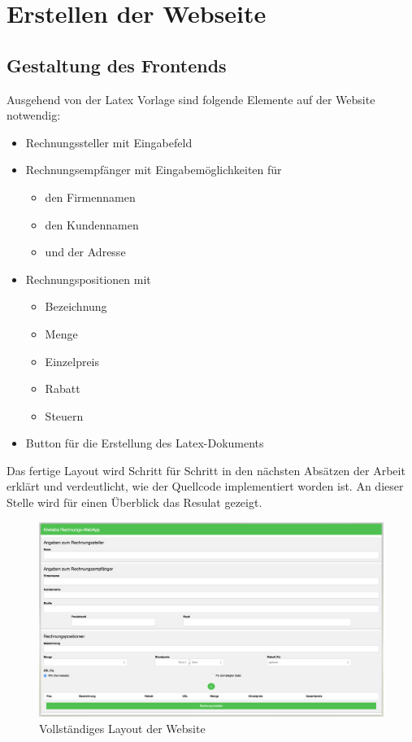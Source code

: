 \section{Erstellen der Webseite}
\label{sec:Erstellen_Webseite}
\subsection{Gestaltung des Frontends}
\label{subsec:Gestaltung_Webseite}
Ausgehend von der Latex Vorlage sind folgende Elemente auf der Website notwendig: 
%
\begin{itemize}
	\item  Rechnungssteller mit Eingabefeld
    \item  Rechnungsempfänger mit Eingabemöglichkeiten für  	
    		\begin{itemize}
				\item den Firmennamen
            	\item den Kundennamen
            	\item und der Adresse
         	\end{itemize}   
     \item Rechnungspositionen mit 
    	 	\begin{itemize}
				\item Bezeichnung
            	\item Menge
            	\item Einzelpreis
           	    \item Rabatt
           		\item Steuern
            \end{itemize}  
     
	\item Button für die Erstellung des Latex-Dokuments    
\end{itemize}
%
Das fertige Layout wird Schritt für Schritt in den nächsten Absätzen der Arbeit erklärt und verdeutlicht, wie der Quellcode implementiert worden ist. An dieser Stelle wird für einen Überblick das Resulat gezeigt.
%
\begin{figure}[H]
    \centering
    \includegraphics[width=1.0\textwidth]{imports/Layoutgesamt}
    \caption{Vollständiges Layout der Website}
\end{figure}

